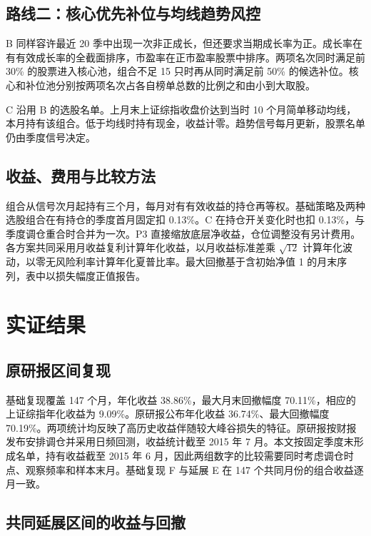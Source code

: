 \subsection{路线二：核心优先补位与均线趋势风控}

B 同样容许最近 20 季中出现一次非正成长，但还要求当期成长率为正。成长率在有有效成长率的全截面排序，市盈率在正市盈率股票中排序。两项名次同时满足前 30\% 的股票进入核心池，组合不足 15 只时再从同时满足前 50\% 的候选补位。核心和补位池分别按两项名次占各自榜单总数的比例之和由小到大取股。

C 沿用 B 的选股名单。上月末上证综指收盘价达到当时 10 个月简单移动均线，本月持有该组合。低于均线时持有现金，收益计零。趋势信号每月更新，股票名单仍由季度信号决定。

\subsection{收益、费用与比较方法}

组合从信号次月起持有三个月，每月对有有效收益的持仓再等权。基础策略及两种选股组合在有持仓的季度首月固定扣 0.13\%。C 在持仓开关变化时也扣 0.13\%，与季度调仓重合时合并为一次。P3 直接缩放底层净收益，仓位调整没有另计费用。各方案共同采用月收益复利计算年化收益，以月收益标准差乘 $\sqrt{12}$ 计算年化波动，以零无风险利率计算年化夏普比率。最大回撤基于含初始净值 1 的月末序列，表中以损失幅度正值报告。

\section{实证结果}

\subsection{原研报区间复现}

基础复现覆盖 147 个月，年化收益 38.86\%，最大月末回撤幅度 70.11\%，相应的上证综指年化收益为 9.09\%。原研报公布年化收益 36.74\%、最大回撤幅度 70.19\%。两项统计均反映了高历史收益伴随较大峰谷损失的特征。原研报按财报发布安排调仓并采用日频回测，收益统计截至 2015 年 7 月。本文按固定季度末形成名单，持有收益截至 2015 年 6 月，因此两组数字的比较需要同时考虑调仓时点、观察频率和样本末月。基础复现 F 与延展 E 在 147 个共同月份的组合收益逐月一致。

\subsection{共同延展区间的收益与回撤}

